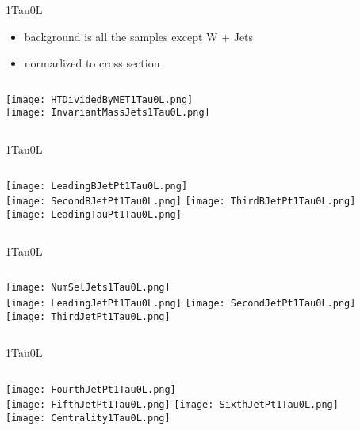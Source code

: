 \documentclass{beamer}
\begin{document}
\begin{frame}{1Tau0L}
    \begin{itemize}
    \item
        background is all the samples except W + Jets
    \item
        normarlized to cross section
    \end{itemize}
    \begin{columns}[t]
    \centering
    \texttt{[image: HTDividedByMET1Tau0L.png]}\\
    \centering
    \texttt{[image: InvariantMassJets1Tau0L.png]}
    \end{columns}
\end{frame}
\begin{frame}{1Tau0L}
    \begin{columns}[t]
    \centering
    \texttt{[image: LeadingBJetPt1Tau0L.png]}\\
    \texttt{[image: SecondBJetPt1Tau0L.png]}
    \centering
    \texttt{[image: ThirdBJetPt1Tau0L.png]}\\
    \texttt{[image: LeadingTauPt1Tau0L.png]}
    \end{columns}
\end{frame}
\begin{frame}{1Tau0L}
    \begin{columns}[t]
    \centering
    \texttt{[image: NumSelJets1Tau0L.png]}\\
    \texttt{[image: LeadingJetPt1Tau0L.png]}
    \centering
    \texttt{[image: SecondJetPt1Tau0L.png]}\\
    \texttt{[image: ThirdJetPt1Tau0L.png]}
    \end{columns}
\end{frame}
\begin{frame}{1Tau0L}
    \begin{columns}[t]
    \centering
    \texttt{[image: FourthJetPt1Tau0L.png]}\\
    \texttt{[image: FifthJetPt1Tau0L.png]}
    \centering
    \texttt{[image: SixthJetPt1Tau0L.png]}\\
    \texttt{[image: Centrality1Tau0L.png]}
    \end{columns}
\end{frame}
\end{document}
